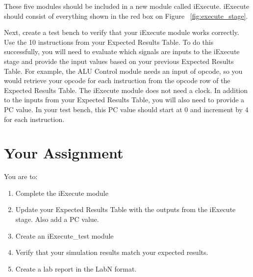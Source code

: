 These five modules should be included in a new module called iExecute.  iExecute should consist of everything shown in the red box on Figure ~\ref{fig:execute_stage}. 

Next, create a test bench to verify that your iExecute module works correctly.  Use the 10 instructions from your Expected Results Table.  To do this successfully, you will need to evaluate which signals are inputs to the iExecute stage and provide the input values based on your previous Expected Results Table.  For example, the ALU Control module needs an input of opcode, so you would retrieve your opcode for each instruction from the opcode row of the Expected Results Table.  The iExecute module does not need a clock.  In addition to the inputs from your Expected Results Table, you will also need to provide a PC value.  In your test bench, this PC value should start at 0 and increment by 4 for each instruction.

\section{Your Assignment}
You are to:
\begin{enumerate}
\item Complete the iExecute module 
\item Update your Expected Results Table with the outputs from the iExecute stage.  Also add a PC value. 
\item Create an iExecute\_test module
\item Verify that your simulation results match your expected results.
\item Create a lab report in the LabN format.
\end{enumerate} 